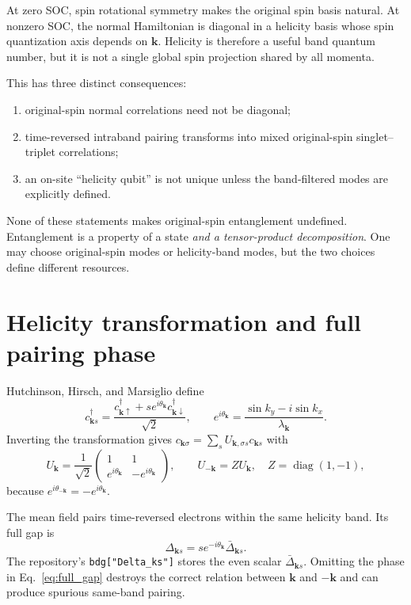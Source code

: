 \documentclass[11pt]{article}
\newcommand{\kb}{\mathbf k}
\begin{document}
At zero SOC, spin rotational symmetry makes the original spin basis natural. At nonzero SOC, the normal Hamiltonian is diagonal in a helicity basis whose spin quantization axis depends on $\kb$. Helicity is therefore a useful band quantum number, but it is not a single global spin projection shared by all momenta.

This has three distinct consequences:
\begin{enumerate}[label=(\roman*)]
\item original-spin normal correlations need not be diagonal;
\item time-reversed intraband pairing transforms into mixed original-spin singlet--triplet correlations;
\item an on-site ``helicity qubit'' is not unique unless the band-filtered modes are explicitly defined.
\end{enumerate}
None of these statements makes original-spin entanglement undefined. Entanglement is a property of a state \emph{and a tensor-product decomposition}. One may choose original-spin modes or helicity-band modes, but the two choices define different resources.

\section{Helicity transformation and full pairing phase}
\label{sec:helicity}

Hutchinson, Hirsch, and Marsiglio define~\cite{Hutchinson2018}
\begin{equation}
c_{\kb s}^{\dagger}
=\frac{c_{\kb\uparrow}^{\dagger}+s e^{i\theta_{\kb}}c_{\kb\downarrow}^{\dagger}}{\sqrt2},
\qquad
e^{i\theta_{\kb}}=\frac{\sin k_y-i\sin k_x}{\lambda_{\kb}}.
\label{eq:helicity_operators}
\end{equation}
Inverting the transformation gives $c_{\kb\sigma}=\sum_s U_{\kb,\sigma s}c_{\kb s}$ with
\begin{equation}
U_{\kb}=\frac1{\sqrt2}
\begin{pmatrix}
1&1\\
e^{i\theta_{\kb}}&-e^{i\theta_{\kb}}
\end{pmatrix},
\qquad U_{-\kb}=ZU_{\kb},\quad Z=\operatorname{diag}(1,-1),
\label{eq:spinors}
\end{equation}
because $e^{i\theta_{-\kb}}=-e^{i\theta_{\kb}}$.

The mean field pairs time-reversed electrons within the same helicity band. Its full gap is
\begin{equation}
\boxed{\Delta_{\kb s}=s e^{-i\theta_{\kb}}\bar\Delta_{\kb s}.}
\label{eq:full_gap}
\end{equation}
The repository's \verb|bdg["Delta_ks"]| stores the even scalar $\bar\Delta_{\kb s}$. Omitting the phase in Eq.~\eqref{eq:full_gap} destroys the correct relation between $\kb$ and $-\kb$ and can produce spurious same-band pairing.
\end{document}
